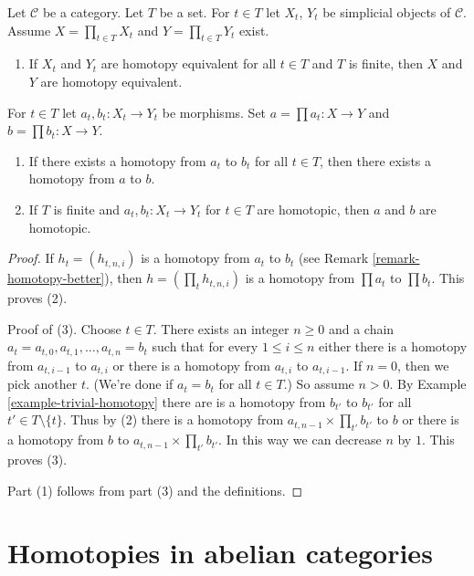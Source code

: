 \begin{lemma}
\label{lemma-products-homotopy}
Let $\mathcal{C}$ be a category. Let $T$ be a set. For $t \in T$
let $X_t$, $Y_t$ be simplicial objects of $\mathcal{C}$. Assume
$X = \prod_{t \in T} X_t$ and $Y = \prod_{t \in T} Y_t$ exist.
\begin{enumerate}
\item If $X_t$ and $Y_t$ are homotopy equivalent for all $t \in T$
and $T$ is finite, then $X$ and $Y$ are homotopy equivalent.
\end{enumerate}
For $t \in T$ let $a_t, b_t : X_t \to Y_t$ be morphisms.
Set $a = \prod a_t : X \to Y$ and $b = \prod b_t : X \to Y$.
\begin{enumerate}
\item[(2)] If there exists a homotopy from $a_t$ to $b_t$ for
all $t \in T$, then there exists a homotopy from $a$ to $b$.
\item[(3)] If $T$ is finite and $a_t, b_t : X_t \to Y_t$ for $t \in T$
are homotopic, then $a$ and $b$ are homotopic.
\end{enumerate}
\end{lemma}

\begin{proof}
If $h_t = (h_{t, n , i})$ is a homotopy from $a_t$ to $b_t$
(see Remark \ref{remark-homotopy-better}), then
$h = (\prod_t h_{t, n, i})$ is a homotopy from $\prod a_t$ to $\prod b_t$.
This proves (2).

\medskip\noindent
Proof of (3). Choose $t \in T$. There exists an integer $n \geq 0$
and a chain $a_t = a_{t, 0}, a_{t, 1}, \ldots, a_{t, n} = b_t$ such that
for every $1 \leq i \leq n$ either there is a homotopy from
$a_{t, i - 1}$ to $a_{t, i}$ or there is a homotopy from
$a_{t, i}$ to $a_{t, i - 1}$. If $n = 0$, then we pick another $t$.
(We're done if $a_t = b_t$ for all $t \in T$.) So assume $n > 0$.
By Example \ref{example-trivial-homotopy}
there are is a homotopy from $b_{t'}$ to $b_{t'}$ for all
$t' \in T \setminus \{t\}$. Thus by (2) there is a homotopy from
$a_{t, n - 1} \times \prod_{t'} b_{t'}$ to $b$ or there is a
homotopy from $b$ to $a_{t, n - 1} \times \prod_{t'} b_{t'}$.
In this way we can decrease $n$ by $1$. This proves (3).

\medskip\noindent
Part (1) follows from part (3) and the definitions.
\end{proof}




\section{Homotopies in abelian categories}
\label{section-homotopy-abelian}

